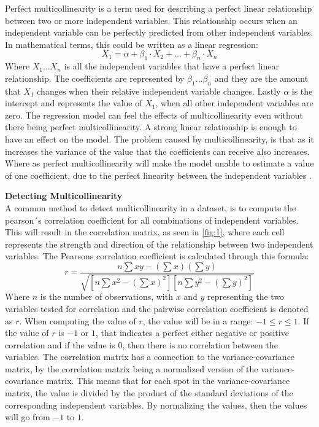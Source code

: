 Perfect multicollinearity is a term used for describing a perfect linear relationship between two or more independent variables. This relationship occurs when an independent variable can be perfectly predicted from other independent variables. In mathematical terms, this could be written as a linear regression:
\begin{equation}
X_1 = \alpha+\beta_1\cdot X_2+...+\beta_n\cdot X_n
\end{equation}
Where $X_1...X_n$ is all the independent variables that have a perfect linear relationship. The coefficients are represented by $\beta_1...\beta_n$ and they are the amount that $X_1$ changes when their relative independent variable changes.
Lastly $\alpha$ is the intercept and represents the value of $X_1$, when all other independent variables are zero.
\newline
The regression model can feel the effects of multicollinearity even without there being perfect multicollinearity. A strong linear relationship is enough to have an effect on the model. The problem caused by multicollinearity, is that as it increases the variance of the value that the coefficients can receive also increases. Where as perfect multicollinearity will make the model unable to estimate a value of one coefficient, due to the perfect linearity between the independent variables \cite{MultAndMis}.
\newline

\noindent \textbf{Detecting Multicollinearity}\\
A common method to detect multicollinearity in a dataset, is to compute the pearson´s correlation coefficient for all combinations of independent variables. This will result in the correlation matrix, as seen in \autoref{fig:1}, where each cell represents the strength and direction of the relationship between two independent variables. The Pearsons correlation coefficient is calculated through this formula:
\begin{equation}
r = \frac{n \sum xy - (\sum x)(\sum y)}{\sqrt{[n \sum x^2 - (\sum x)^2][n \sum y^2 - (\sum y)^2]}}
\end{equation}
Where $n$ is the number of observations, with $x$ and $y$ representing the two variables tested for correlation and the pairwise correlation coefficient is denoted as $r$. When computing the value of $r$, the value will be in a range: $-1\leq r \leq 1$. If the value of $r$ is $-1$ or $1$, that indicates a perfect either negative or positive correlation and if the value is $0$, then there is no correlation between the variables. The correlation matrix has a connection to the variance-covariance matrix, by the correlation matrix being a normalized version of the variance-covariance matrix. This means that for each spot in the variance-covariance matrix, the value is divided by the product of the standard deviations of the corresponding independent variables. By normalizing the values, then the values will go from $-1$ to $1$.\cite{DetectMulti} \newline


